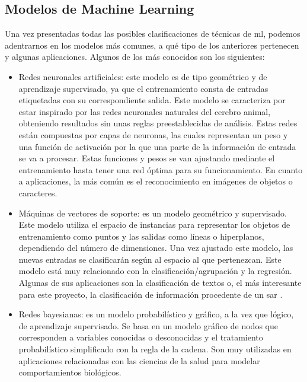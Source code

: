 \subsection{Modelos de Machine Learning}
\par Una vez presentadas todas las posibles clasificaciones de técnicas de \gls{ml}, podemos adentrarnos en los modelos más comunes, a qué tipo de los anteriores pertenecen y algunas aplicaciones. Algunos de los más conocidos son los siguientes:
\begin{itemize}
	\item Redes neuronales artificiales: este modelo es de tipo geométrico y de aprendizaje supervisado, ya que el entrenamiento consta de entradas etiquetadas con su correspondiente salida. Este modelo se caracteriza por estar inspirado por las redes neuronales naturales del cerebro animal, obteniendo resultados sin unas reglas preestablecidas de análisis. Estas redes están compuestas por capas de neuronas, las cuales representan un peso y una función de activación por la que una parte de la información de entrada se va a procesar. Estas funciones y pesos se van ajustando mediante el entrenamiento hasta tener una red óptima para su funcionamiento. En cuanto a aplicaciones, la más común es el reconocimiento en imágenes de objetos o caracteres.
	\item Máquinas de vectores de soporte: es un modelo geométrico y supervisado. Este modelo utiliza el espacio de instancias para representar los objetos de entrenamiento como puntos y las salidas como líneas o hiperplanos, dependiendo del número de dimensiones. Una vez ajustado este modelo, las nuevas entradas se clasificarán según al espacio al que pertenezcan. Este modelo está muy relacionado con la clasificación/agrupación y la regresión. Algunas de sus aplicaciones son la clasificación de textos \citep{MLText} o, el más interesante para este proyecto, la clasificación de información procedente de un \gls{sar} \citep{MLSAR}.
	\item Redes bayesianas: es un modelo probabilístico y gráfico, a la vez que lógico, de aprendizaje supervisado. Se basa en un modelo gráfico de nodos que corresponden a variables conocidas o desconocidas y el tratamiento probabilístico simplificado con la regla de la cadena. Son muy utilizadas en aplicaciones relacionadas con las ciencias de la salud para modelar comportamientos biológicos. 

\end{itemize}
